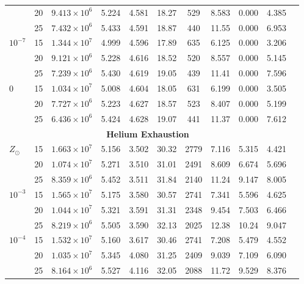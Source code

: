 {\begin{table}[h!]
{\begin{tabular}{lcccccccccc}
                    & 20 & $9.413 \times 10^6$  & 5.224 & 4.581 & 18.27 & 529 & 8.583  & 0.000  & 4.385  \\
                    & 25 & $7.432 \times 10^6$  & 5.433 & 4.591 & 18.87 & 440 & 11.55  & 0.000  & 6.953  \\
        $10^{-7}$   & 15 & $1.344 \times 10^7$  & 4.999 & 4.596 & 17.89 & 635 & 6.125  & 0.000  & 3.206  \\
                    & 20 & $9.121 \times 10^6$  & 5.228 & 4.616 & 18.52 & 520 & 8.557  & 0.000  & 5.145  \\
                    & 25 & $7.239 \times 10^6$  & 5.430 & 4.619 & 19.05 & 439 & 11.41  & 0.000  & 7.596  \\
        $0$         & 15 & $1.034 \times 10^7$  & 5.008 & 4.604 & 18.05 & 631 & 6.199  & 0.000  & 3.505  \\
                    & 20 & $7.727 \times 10^6$  & 5.223 & 4.627 & 18.57 & 523 & 8.407  & 0.000  & 5.199  \\
                    & 25 & $6.436 \times 10^6$  & 5.424 & 4.628 & 19.07 & 441 & 11.37  & 0.000  & 7.612  \\
        \midrule
	\multicolumn{10}{c}{\textbf{ Helium Exhaustion }} \\
	\midrule
	$Z_{\odot}$ & 15 & $1.663 \times 10^7$  & 5.156 & 3.502 & 30.32 & 2779 & 7.116 & 5.315 & 4.421  \\
                    & 20 & $1.074 \times 10^7$  & 5.271 & 3.510 & 31.01 & 2491 & 8.609 & 6.674 & 5.696  \\
                    & 25 & $8.359 \times 10^6$  & 5.452 & 3.511 & 31.84 & 2140 & 11.24 & 9.147 & 8.005  \\
        $10^{-3}$   & 15 & $1.565 \times 10^7$  & 5.175 & 3.580 & 30.57 & 2741 & 7.341 & 5.596 & 4.625  \\
                    & 20 & $1.044 \times 10^7$  & 5.321 & 3.591 & 31.31 & 2348 & 9.454 & 7.503 & 6.466  \\
                    & 25 & $8.219 \times 10^6$  & 5.505 & 3.590 & 32.13 & 2025 & 12.38 & 10.24 & 9.047  \\
        $10^{-4}$   & 15 & $1.532 \times 10^7$  & 5.160 & 3.617 & 30.46 & 2741 & 7.208 & 5.479 & 4.552  \\
                    & 20 & $1.035 \times 10^7$  & 5.345 & 4.080 & 31.25 & 2409 & 9.039 & 7.109 & 6.090  \\
                    & 25 & $8.164 \times 10^6$  & 5.527 & 4.116 & 32.05 & 2088 & 11.72 & 9.529 & 8.376  \\

\end{tabular}}
\end{table}}
